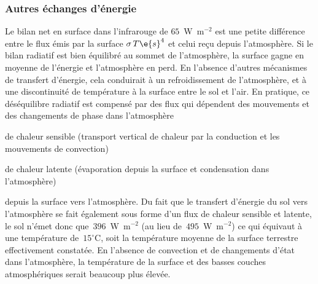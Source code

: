 \sk
\subsubsection{Autres échanges d'énergie}

\sk
Le bilan net en surface dans l'infrarouge de $65$~W~m$^{-2}$ est une petite différence entre le flux émis par la surface $\sigma \, {T\e{s}}^4$ et celui reçu depuis l'atmosphère. Si le bilan radiatif est bien équilibré au sommet de l'atmosphère, la surface gagne en moyenne de l'énergie et l'atmosphère en perd. En l'absence d'autres mécanismes de transfert d'énergie, cela conduirait à un refroidissement de l'atmosphère, et à une discontinuité de température à la surface entre le sol et l'air. En pratique, ce déséquilibre radiatif est compensé par des flux qui dépendent des mouvements et des changements de phase dans l'atmosphère
\begin{citemize}
\item de chaleur sensible (transport vertical de chaleur par la conduction et les mouvements de convection) 
\item de chaleur latente (évaporation depuis la surface et condensation dans l'atmosphère) 
\end{citemize}
depuis la surface vers l'atmosphère. Du fait que le transfert d'énergie du sol vers l'atmosphère se fait également sous forme d'un flux de chaleur sensible et latente, le sol n'émet donc que~$396$~W~m$^{-2}$ (au lieu de~$495$~W~m$^{-2}$) ce qui équivaut à une température de~$15^{\circ}$C, soit la température moyenne de la surface terrestre effectivement constatée. En l'absence de convection et de changements d'état dans l'atmosphère, la température de la surface et des basses couches atmosphériques serait beaucoup plus élevée. 


